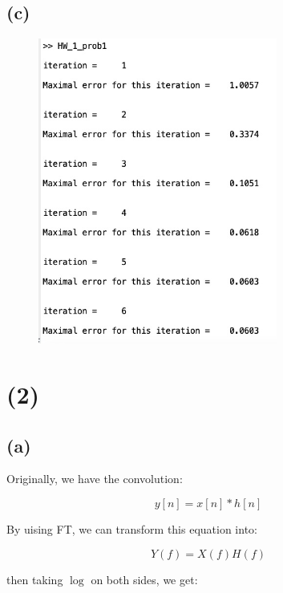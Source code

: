 \documentclass{article}
\begin{document}
\subsection*{(c)}
\begin{figure}[!htb]
    \centering
    \includegraphics[width=0.7\textwidth]{maximal_error_this_iteration}
\end{figure}

\clearpage

\section*{(2)}

\subsection*{(a)}   

Originally, we have the convolution:

\begin{equation*}
    y[n] = x[n] * h[n]
\end{equation*}

By uising FT, we can transform this equation into:

\begin{equation*}
    Y(f) = X(f)H(f)
\end{equation*}

then taking $\log$ on both sides, we get:
\end{document}
